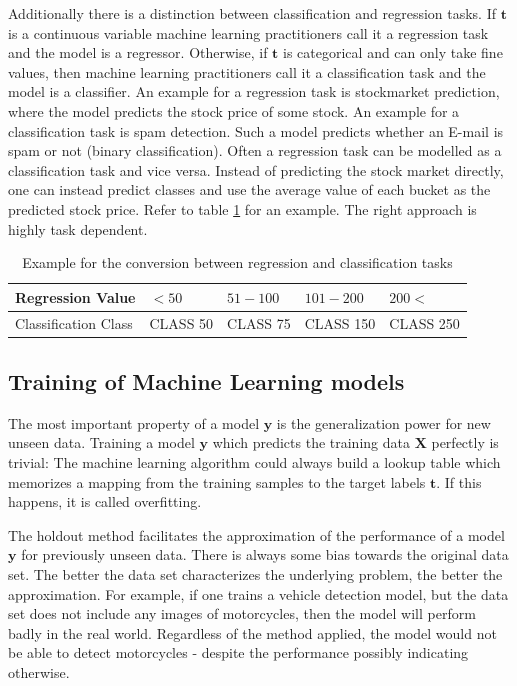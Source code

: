 \documentclass[draft,final,oneside]{vutinfth} %
\begin{document}
Additionally there is a distinction between classification and regression tasks. If $\boldsymbol{t}$ is a continuous variable machine learning practitioners call it a regression task and the model is a regressor. Otherwise, if $\boldsymbol{t}$ is categorical and can only take fine values, then machine learning practitioners call it a classification task and the model is a classifier. An example for a regression task is stockmarket prediction, where the model predicts the stock price of some stock. An example for a classification task is spam detection. Such a model predicts whether an E-mail is spam or not (binary classification). Often a regression task can be modelled as a classification task and vice versa. Instead of predicting the stock market directly, one can instead predict classes and use the average value of each bucket as the predicted stock price. Refer to table \ref{table:conversionregressclass} for an example. The right approach is highly task dependent.

\begin{table}[]
\centering
\begin{tabular}{|l||l|l|l|l|}
\hline
Regression Value & $<50$ & $51 - 100$ & $101 - 200$ & $200<$ \\
\hline
Classification Class & CLASS 50      & CLASS 75 & CLASS 150 & CLASS 250 \\
\hline
\end{tabular}
\caption{Example for the conversion between regression and classification tasks }
\label{table:conversionregressclass}
\end{table}

\subsection{Training of Machine Learning models}

The most important property of a model $\boldsymbol{y}$ is the generalization power for new unseen data. Training a model $\boldsymbol{y}$ which predicts the training data $\boldsymbol{X}$ perfectly is trivial: The machine learning algorithm could always build a lookup table which memorizes a mapping from the training samples to the target labels $\boldsymbol{t}$. If this happens, it is called overfitting.

The holdout method facilitates the approximation of the performance of a model $\boldsymbol{y}$ for previously unseen data. There is always some bias towards the original data set. The better the data set characterizes the underlying problem, the better the approximation. For example, if one trains a vehicle detection model, but the data set does not include any images of motorcycles, then the model will perform badly in the real world. Regardless of the method applied, the model would not be able to detect motorcycles - despite the performance possibly indicating otherwise.
\end{document}
